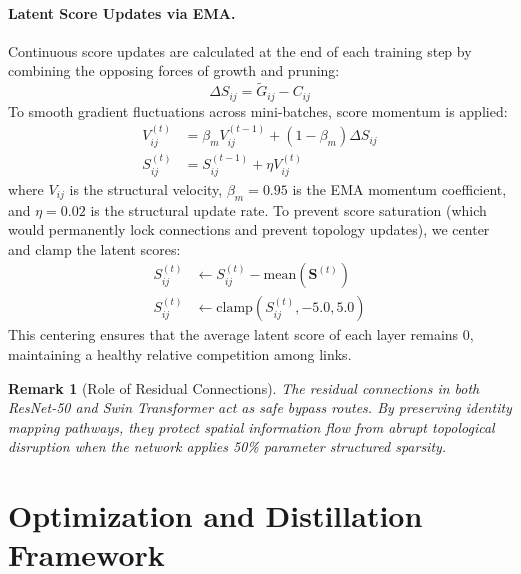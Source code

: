 \documentclass[letterpaper]{article} %
\newtheorem{remark}{Remark}
\begin{document}
\paragraph{Latent Score Updates via EMA.} Continuous score updates are calculated at the end of each training step by combining the opposing forces of growth and pruning:
\begin{equation}\label{eq:delta_S}
    \Delta S_{ij} = \tilde{G}_{ij} - C_{ij}
\end{equation}
To smooth gradient fluctuations across mini-batches, score momentum is applied:
\begin{align}
    V_{ij}^{(t)} &= \beta_m V_{ij}^{(t-1)} + (1 - \beta_m) \Delta S_{ij} \\
    S_{ij}^{(t)} &= S_{ij}^{(t-1)} + \eta V_{ij}^{(t)}
\end{align}
where $V_{ij}$ is the structural velocity, $\beta_m = 0.95$ is the EMA momentum coefficient, and $\eta = 0.02$ is the structural update rate. To prevent score saturation (which would permanently lock connections and prevent topology updates), we center and clamp the latent scores:
\begin{align}
    S_{ij}^{(t)} &\leftarrow S_{ij}^{(t)} - \text{mean}(\bm{S}^{(t)}) \\
    S_{ij}^{(t)} &\leftarrow \text{clamp}(S_{ij}^{(t)}, -5.0, 5.0)
\end{align}
This centering ensures that the average latent score of each layer remains 0, maintaining a healthy relative competition among links.

\begin{remark}[Role of Residual Connections]
The residual connections in both ResNet-50 and Swin Transformer act as safe bypass routes. By preserving identity mapping pathways, they protect spatial information flow from abrupt topological disruption when the network applies 50\% parameter structured sparsity.
\end{remark}

\section{Optimization and Distillation Framework}\label{sec:optimization}
\end{document}
